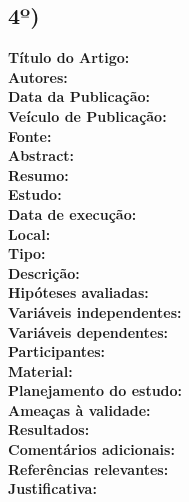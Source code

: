 \documentclass[12pt,a4paper]{article}
\begin{document}
\subsection*{4º)}
\noindent \textbf{Título do Artigo:} \hrulefill \\
\textbf{Autores:} \hrulefill \\
\textbf{Data da Publicação:} \hrulefill \\
\textbf{Veículo de Publicação:} \hrulefill \\
\textbf{Fonte:} \hrulefill \\
\textbf{Abstract:} \hrulefill \\
\textbf{Resumo:} \hrulefill \\
\textbf{Estudo:} \hrulefill \\
\textbf{Data de execução:} \hrulefill \\
\textbf{Local:} \hrulefill \\
\textbf{Tipo:} \hrulefill \\
\textbf{Descrição:} \hrulefill \\
\textbf{Hipóteses avaliadas:} \hrulefill \\
\textbf{Variáveis independentes:} \hrulefill \\
\textbf{Variáveis dependentes:} \hrulefill \\
\textbf{Participantes:} \hrulefill \\
\textbf{Material:} \hrulefill \\
\textbf{Planejamento do estudo:} \hrulefill \\
\textbf{Ameaças à validade:} \hrulefill \\
\textbf{Resultados:} \hrulefill \\
\textbf{Comentários adicionais:} \hrulefill \\
\textbf{Referências relevantes:} \hrulefill \\
\textbf{Justificativa:} \hrulefill

\vspace{1cm}
\end{document}
